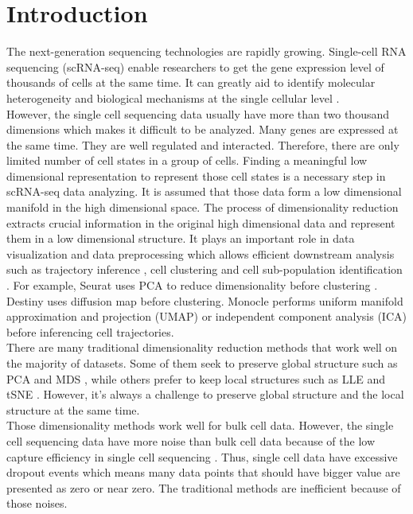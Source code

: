 \section{Introduction}
The next-generation sequencing technologies are rapidly growing. Single-cell RNA sequencing (scRNA-seq) enable researchers to get the gene expression level of thousands of cells at the same time. It can greatly aid to identify molecular heterogeneity and biological mechanisms at the single cellular level \cite{shapiro2013single}.\\
However, the single cell sequencing data usually have more than two thousand dimensions which makes it difficult to be analyzed. Many genes are expressed at the same time. They are well regulated and interacted. Therefore, there are only limited number of cell states in a group of cells. Finding a meaningful low dimensional representation to represent those cell states is a necessary step in scRNA-seq data analyzing. It is assumed that those data form a low dimensional manifold in the high dimensional space. The process of dimensionality reduction extracts crucial information in the original high dimensional data and represent them in a low dimensional structure.  It plays an important role in data visualization and data preprocessing which allows efficient downstream analysis such as trajectory inference \cite{Saelens2019}, cell clustering \cite{weber2016comparison} and cell sub-population identification \cite{Hwang2018}. For example, Seurat uses PCA \cite{Abdi2010} to reduce dimensionality before clustering \cite{Satija2015}. Destiny \cite{angerer2016destiny} uses diffusion map before clustering. Monocle \cite{Qiu2017} performs uniform manifold approximation and projection (UMAP) \cite{McInnes2018} or independent component analysis (ICA) \cite{hyvarinen2000independent} before inferencing cell trajectories. \\
There are many traditional dimensionality reduction methods that work well on the majority of datasets. Some of them seek to preserve global structure such as PCA \cite{Abdi2010} and MDS \cite{Kruskal1964}, while others prefer to keep local structures such as LLE \cite{roweis2000nonlinear} and tSNE \cite{Kobak2019}. However, it’s always a challenge to preserve global structure and the local structure at the same time. \\ 
Those dimensionality methods work well for bulk cell data. However, the single cell sequencing data have more noise than bulk cell data because of the low capture efficiency in single cell sequencing \cite{Peng2019}. Thus, single cell data have excessive dropout events which means many data points that should have bigger value are presented as zero or near zero. The traditional methods are inefficient because of those noises.  \\
